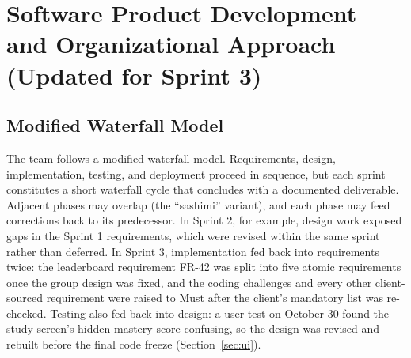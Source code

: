 \documentclass[12pt,letterpaper]{article}
\begin{document}
\section{Software Product Development and Organizational Approach (Updated for Sprint 3)}\label{sec:process}

\subsection{Modified Waterfall Model}
The team follows a modified waterfall model. Requirements, design, implementation,
testing, and deployment proceed in sequence, but each sprint constitutes a short
waterfall cycle that concludes with a documented deliverable. Adjacent phases may
overlap (the ``sashimi'' variant), and each phase may feed corrections back to its
predecessor. In Sprint 2, for example, design work exposed gaps in the Sprint 1
requirements, which were revised within the same sprint rather than deferred. In
Sprint 3, implementation fed back into requirements twice: the leaderboard requirement
FR-42 was split into five atomic requirements once the group design was fixed, and the
coding challenges and every other client-sourced requirement were raised to Must after
the client's mandatory list was re-checked. Testing also fed back into design: a user test on October 30 found the
study screen's hidden mastery score confusing, so the design was revised and rebuilt
before the final code freeze (Section~\ref{sec:ui}).
\end{document}
